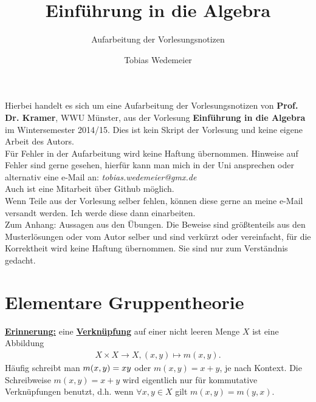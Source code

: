 \documentclass[a4paper, pagesize=pdftex, pdftex, twoside, headsepline, index=totoc,toc=listof, fontsize=10pt, cleardoublepage=empty, headinclude, DIV=13, BCOR=13mm]{scrartcl}
\author{Tobias Wedemeier}
\title{Einführung in die Algebra}
\subtitle{Aufarbeitung der Vorlesungsnotizen}
\newcommand{\bet}[1]{\uline{\textbf{#1}}} %
\newcommand{\Index}[1]{\uline{\textbf{#1}}\index{#1}} %
\begin{document}
\maketitle
\thispagestyle{empty}
\newpage

\thispagestyle{empty}
\vspace*{\fill}
\begin{center}
	Hierbei handelt es sich um eine Aufarbeitung der Vorlesungsnotizen von \textbf{Prof. Dr. Kramer}, WWU Münster, aus der Vorlesung \textbf{Einführung in die Algebra} im Wintersemester 2014/15. Dies ist kein Skript der Vorlesung und keine eigene Arbeit des Autors.\\
	\vspace{2cm}
	Für Fehler in der Aufarbeitung wird keine Haftung übernommen. Hinweise auf Fehler sind gerne gesehen, hierfür kann man mich in der Uni ansprechen oder alternativ eine e-Mail an: \textit{tobias.wedemeier@gmx.de}\\
	Auch ist eine Mitarbeit über Github möglich.\\
	\vspace{2cm}
	Wenn Teile aus der Vorlesung selber fehlen, können diese gerne an meine e-Mail versandt werden. Ich werde diese dann einarbeiten.\\
	\vspace{2cm}
	Zum Anhang: Aussagen aus den Übungen. Die Beweise sind größtenteils aus den Musterlösungen oder vom Autor selber und sind verkürzt oder vereinfacht, für die Korrektheit wird keine Haftung übernommen. Sie sind nur zum Verständnis gedacht.
\end{center}
\vspace*{\fill}
\newpage


\tableofcontents
\cleardoubleoddemptypage %

\setcounter{page}{1}

\section{Elementare Gruppentheorie}
\label{sec:elementare_gruppentheorie}

\bet{Erinnerung:} eine \Index{Verknüpfung} auf einer nicht leeren Menge $X$ ist eine Abbildung
\begin{equation*}
\begin{aligned}
X\times X \to X , (x,y) \mapsto m(x,y).
\end{aligned}
\end{equation*}
Häufig schreibt man $m(x,y)= x \* y$ oder $ m(x,y) = x + y$, je nach Kontext. Die Schreibweise $m(x,y)=x+y$ wird eigentlich nur für kommutative Verknüpfungen benutzt, d.h. wenn $\forall x,y\in X$ gilt $m(x,y)=m(y,x)$.
\end{document}
